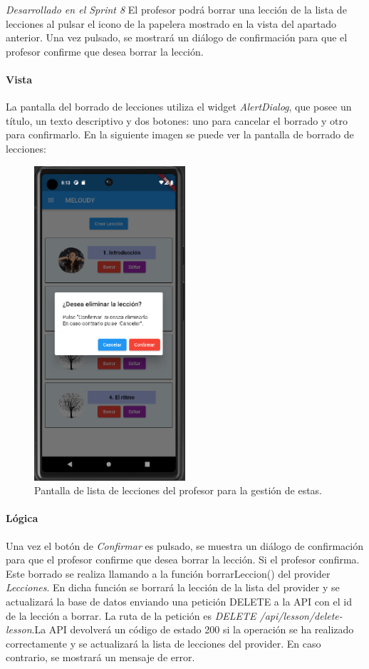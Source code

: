 \textit{Desarrollado en el Sprint 8}
El profesor podrá borrar una lección de la lista de lecciones al pulsar el icono de la papelera mostrado en la vista del apartado anterior. Una vez pulsado, se mostrará un diálogo de confirmación para que el profesor confirme que desea borrar la lección.

\paragraph*{Vista}
La pantalla del borrado de lecciones utiliza el widget \textit{AlertDialog}, que posee
un título, un texto descriptivo y dos botones: uno para cancelar el borrado y otro para confirmarlo.
En la siguiente imagen se puede ver la pantalla de borrado de lecciones:


\begin{figure}[H]
  \centering
  \includegraphics[width=0.5\textwidth]{imagenes/c7/borrarleccion.png}
  \caption{Pantalla de lista de lecciones del profesor para la gestión de estas.} 
  \label{fig:login}
\end{figure}

\paragraph*{Lógica}
Una vez el botón de \textit{Confirmar} es pulsado, se muestra un diálogo de confirmación para que el profesor confirme que desea borrar la lección. Si el profesor confirma.
Este borrado se realiza llamando a la función borrarLeccion() del provider \textit{Lecciones}. En dicha función se borrará la lección de la lista del provider y se actualizará la base de datos enviando
una petición DELETE a la API con el id de la lección a borrar. La ruta de la petición es \textit{DELETE /api/lesson/delete-lesson}.La API devolverá un código de estado 200 si la operación se ha realizado correctamente y se actualizará la lista de lecciones del provider. En caso contrario, se mostrará un mensaje de error.


